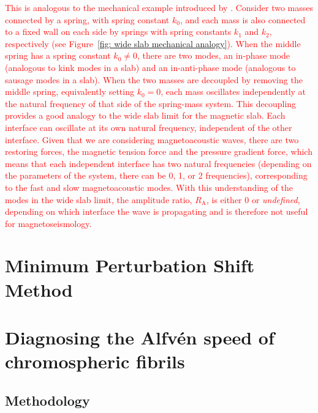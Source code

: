 \documentclass[12pt]{../style-files/ociamthesis}
\begin{document}
\textcolor{red}{This is analogous to the mechanical example introduced by \cite{all_etal17}. Consider two masses connected by a spring, with spring constant $k_0$, and each mass is also connected to a fixed wall on each side by springs with spring constants $k_1$ and $k_2$, respectively (see Figure~\ref{fig: wide slab mechanical analogy}). When the middle spring has a spring constant $k_0 \neq 0$, there are two modes, an in-phase mode (analogous to kink modes in a slab) and an in-anti-phase mode (analogous to sausage modes in a slab). When the two masses are decoupled by removing the middle spring, equivalently setting $k_0 = 0$, each mass oscillates independently at the natural frequency of that side of the spring-mass system. This decoupling provides a good analogy to the wide slab limit for the magnetic slab. Each interface can oscillate at its own natural frequency, independent of the other interface. Given that we are considering magnetoacoustic waves, there are two restoring forces, the magnetic tension force and the pressure gradient force, which means that each independent interface has two natural frequencies (depending on the parameters of the system, there can be 0, 1, or 2 frequencies), corresponding to the fast and slow magnetoacoustic modes. With this understanding of the modes in the wide slab limit, the amplitude ratio, $R_\textrm{A}$, is either $0$ or \textit{undefined}, depending on which interface the wave is propagating and is therefore not useful for magnetoseismology.}

\section{Minimum Perturbation Shift Method}
\label{sec: MPSM}

\section{Diagnosing the Alfv\'{e}n speed of chromospheric fibrils}
\label{sec: fibrils}

\subsection{Methodology}
\end{document}
